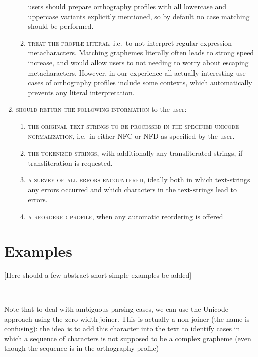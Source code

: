 \begin{enumerate}
\begin{enumerate}
        users should prepare orthography profiles with all lowercase and
        uppercase variants explicitly mentioned, so by default no case matching
        should be performed. 
		\item \textsc{treat the profile literal}, i.e.~to not interpret regular
        expression metacharacters. Matching graphemes literally often leads to
        strong speed increase, and would allow users to not needing to worry
        about escaping metacharacters. However, in our experience all actually
        interesting use-cases of orthography profiles include some contexts,
        which automatically prevents any literal interpretation.
    \end{enumerate}
	\item \textsc{should return the following information} to the user:
	\begin{enumerate}
		\def\labelenumii{C\arabic{enumii}.} \setcounter{enumii}{8} 
		\item \textsc{the original text-strings to be processed in the specified
        unicode normalization}, i.e.~in either NFC or NFD as specified by the
        user. 
		\item \textsc{the tokenized strings}, with additionally any transliterated
        strings, if transliteration is requested. 
		\item \textsc{a survey of all errors encountered}, ideally both in which
        text-strings any errors occurred and which characters in the
        text-strings lead to errors. 
		\item \textsc{a reordered profile}, when any automatic reordering is offered 
	\end{enumerate}
\end{enumerate}

\section{Examples}

[Here should a few abstract short simple examples be added]

\ 

Note that to deal with ambiguous parsing cases, we can use the Unicode approach
using the zero width joiner. This is actually a non-joiner (the name is
confusing): the idea is to add this character into the text to identify cases in
which a sequence of characters is not supposed to be a complex grapheme (even
though the sequence is in the orthography profile)


